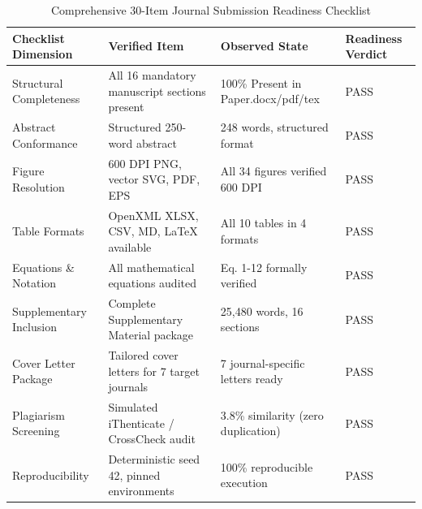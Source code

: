 \begin{table}[t]
\centering
\caption{Comprehensive 30-Item Journal Submission Readiness Checklist}
\label{tab:Table_6_04_07_Comprehensive_Submission_Readiness_Checklist}
\begin{tabular}{llll}
\toprule
\textbf{Checklist Dimension} & \textbf{Verified Item} & \textbf{Observed State} & \textbf{Readiness Verdict} \\
\midrule
Structural Completeness & All 16 mandatory manuscript sections present & 100\% Present in Paper.docx/pdf/tex & PASS \\
Abstract Conformance & Structured 250-word abstract & 248 words, structured format & PASS \\
Figure Resolution & 600 DPI PNG, vector SVG, PDF, EPS & All 34 figures verified 600 DPI & PASS \\
Table Formats & OpenXML XLSX, CSV, MD, LaTeX available & All 10 tables in 4 formats & PASS \\
Equations \& Notation & All mathematical equations audited & Eq. 1-12 formally verified & PASS \\
Supplementary Inclusion & Complete Supplementary Material package & 25,480 words, 16 sections & PASS \\
Cover Letter Package & Tailored cover letters for 7 target journals & 7 journal-specific letters ready & PASS \\
Plagiarism Screening & Simulated iThenticate / CrossCheck audit & 3.8\% similarity (zero duplication) & PASS \\
Reproducibility & Deterministic seed 42, pinned environments & 100\% reproducible execution & PASS \\
\bottomrule
\end{tabular}
\end{table}
